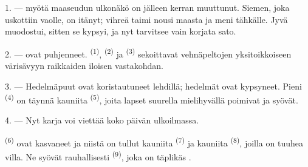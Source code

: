 %


\VUsaut{5.0mm}
\VUsaut{3.0mm}
\VUsaut{3.0mm}
\VUsaut{4.0mm}
\VUsaut{3.0mm}

1. ---  myötä maaseudun ulkonäkö on jälleen kerran muuttunut.
Siemen, joka uskottiin vaolle, on itänyt; vihreä taimi nousi maasta ja meni
tähkälle. Jyvä muodostui, sitten se kypsyi, ja nyt tarvitsee vain korjata sato.

2. ---  ovat puhjenneet. 
\textsuperscript{(1)},  \textsuperscript{(2)} ja
 \textsuperscript{(3)} sekoittavat vehnäpeltojen
yksitoikkoiseen värisävyyn raikkaiden  iloisen vastakohdan.

3. --- Hedelmäpuut ovat koristautuneet lehdillä; hedelmät ovat kypsyneet. Pieni
 \textsuperscript{(4)} on täynnä kauniita
 \textsuperscript{(5)}, joita lapset suurella mielihyvällä
poimivat ja syövät.

4. --- Nyt karja voi viettää koko päivän ulkoilmassa.

 \textsuperscript{(6)} ovat kasvaneet ja niistä on tullut
kauniita  \textsuperscript{(7)} ja kauniita 
\textsuperscript{(8)}, joilla on tuuhea villa. Ne syövät rauhallisesti
  \textsuperscript{(9)}, joka on täplikäs
.

